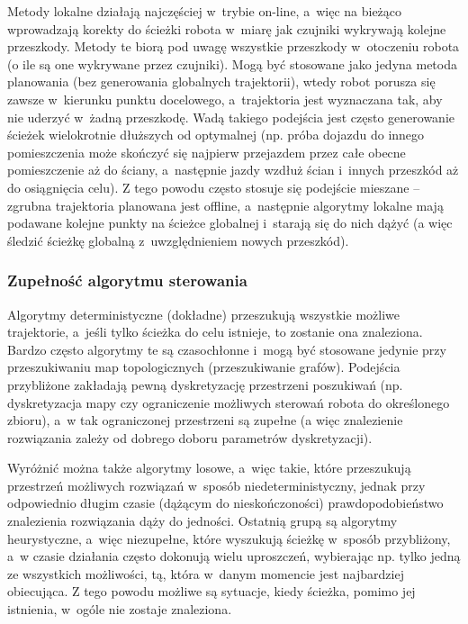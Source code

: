 Metody lokalne działają najczęściej w~trybie on-line, a~więc na bieżąco wprowadzają korekty
do ścieżki robota w~miarę jak czujniki wykrywają kolejne przeszkody. Metody te biorą
pod uwagę wszystkie przeszkody w~otoczeniu robota (o ile są one wykrywane przez czujniki).
Mogą być stosowane jako jedyna metoda planowania (bez generowania globalnych trajektorii),
wtedy robot porusza się zawsze w~kierunku punktu docelowego, a~trajektoria jest wyznaczana
tak, aby nie uderzyć w~żadną przeszkodę. Wadą takiego podejścia jest często generowanie
ścieżek wielokrotnie dłuższych od optymalnej (np. próba dojazdu do innego pomieszczenia
może skończyć się najpierw przejazdem przez całe obecne pomieszczenie aż do ściany, a~następnie
jazdy wzdłuż ścian i~innych przeszkód aż do osiągnięcia celu). Z tego powodu często
stosuje się podejście mieszane -- zgrubna trajektoria planowana jest offline, a~następnie
algorytmy lokalne mają podawane kolejne punkty na ścieżce globalnej i~starają się do nich
dążyć (a więc śledzić ścieżkę globalną z~uwzględnieniem nowych przeszkód).

\subsubsection{Zupełność algorytmu sterowania}

Algorytmy deterministyczne (dokładne) przeszukują wszystkie możliwe trajektorie,
a~jeśli tylko ścieżka do celu istnieje, to zostanie ona znaleziona. Bardzo często algorytmy
te są czasochłonne i~mogą być stosowane jedynie przy przeszukiwaniu map topologicznych
(przeszukiwanie grafów). Podejścia przybliżone zakładają pewną dyskretyzację przestrzeni
poszukiwań (np. dyskretyzacja mapy czy ograniczenie możliwych sterowań robota do określonego
zbioru), a~w tak ograniczonej przestrzeni są zupełne (a więc znalezienie rozwiązania
zależy od dobrego doboru parametrów dyskretyzacji).

Wyróżnić można także algorytmy losowe, a~więc takie, które przeszukują przestrzeń
możliwych rozwiązań w~sposób niedeterministyczny, jednak przy odpowiednio długim czasie
(dążącym do nieskończoności) prawdopodobieństwo znalezienia rozwiązania dąży do jedności.
Ostatnią grupą są algorytmy heurystyczne, a~więc niezupełne, które wyszukują ścieżkę
w~sposób przybliżony, a~w czasie działania często dokonują wielu uproszczeń, wybierając
np. tylko jedną ze wszystkich możliwości, tą, która w~danym momencie jest najbardziej
obiecująca. Z tego powodu możliwe są sytuacje, kiedy ścieżka, pomimo jej istnienia,
w~ogóle nie zostaje znaleziona.

